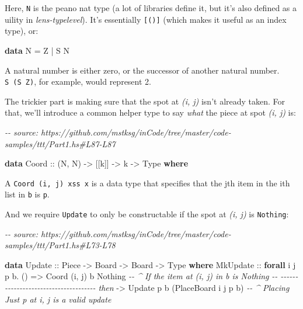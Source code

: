 \documentclass[]{article}
\newenvironment{Shaded}{}{}
\newcommand{\CommentTok}[1]{\textcolor[rgb]{0.38,0.63,0.69}{\textit{#1}}}
\newcommand{\DataTypeTok}[1]{\textcolor[rgb]{0.56,0.13,0.00}{#1}}
\newcommand{\KeywordTok}[1]{\textcolor[rgb]{0.00,0.44,0.13}{\textbf{#1}}}
\newcommand{\NormalTok}[1]{#1}
\newcommand{\OperatorTok}[1]{\textcolor[rgb]{0.40,0.40,0.40}{#1}}
\newcommand{\OtherTok}[1]{\textcolor[rgb]{0.00,0.44,0.13}{#1}}
\begin{document}
Here, \texttt{N} is the peano nat type (a lot of libraries define it, but it's
also defined as a uility in \emph{lens-typelevel}). It's essentially
\texttt{{[}(){]}} (which makes it useful as an index type), or:

\begin{Shaded}
\begin{Highlighting}[]
\KeywordTok{data} \DataTypeTok{N} \OtherTok{=} \DataTypeTok{Z} \OperatorTok{|} \DataTypeTok{S} \DataTypeTok{N}
\end{Highlighting}
\end{Shaded}

A natural number is either zero, or the successor of another natural number.
\texttt{S\ (S\ Z)}, for example, would represent 2.

The trickier part is making sure that the spot at \emph{(i, j)} isn't already
taken. For that, we'll introduce a common helper type to say \emph{what} the
piece at spot \emph{(i, j)} is:

\begin{Shaded}
\begin{Highlighting}[]
\CommentTok{{-}{-} source: https://github.com/mstksg/inCode/tree/master/code{-}samples/ttt/Part1.hs\#L87{-}L87}

\KeywordTok{data} \DataTypeTok{Coord}\OtherTok{ ::}\NormalTok{ (}\DataTypeTok{N}\NormalTok{, }\DataTypeTok{N}\NormalTok{) }\OtherTok{{-}>}\NormalTok{ [[k]] }\OtherTok{{-}>}\NormalTok{ k }\OtherTok{{-}>} \DataTypeTok{Type} \KeywordTok{where}
\end{Highlighting}
\end{Shaded}

A \texttt{Coord\ \textquotesingle{}(i,\ j)\ xss\ x} is a data type that
specifies that the jth item in the ith list in \texttt{b} is \texttt{p}.

And we require \texttt{Update} to only be constructable if the spot at \emph{(i,
j)} is \texttt{Nothing}:

\begin{Shaded}
\begin{Highlighting}[]
\CommentTok{{-}{-} source: https://github.com/mstksg/inCode/tree/master/code{-}samples/ttt/Part1.hs\#L73{-}L78}

\KeywordTok{data} \DataTypeTok{Update}\OtherTok{ ::} \DataTypeTok{Piece} \OtherTok{{-}>} \DataTypeTok{Board} \OtherTok{{-}>} \DataTypeTok{Board} \OtherTok{{-}>} \DataTypeTok{Type} \KeywordTok{where}
    \DataTypeTok{MkUpdate}
\OtherTok{        ::} \KeywordTok{forall}\NormalTok{ i j p b}\OperatorTok{.}\NormalTok{ ()}
        \OtherTok{=>} \DataTypeTok{Coord}\NormalTok{ \textquotesingle{}(i, j) b }\DataTypeTok{\textquotesingle{}Nothing}         \CommentTok{{-}{-} \^{} If the item at (i, j) in b is Nothing}
        \CommentTok{{-}{-} {-}{-}{-}{-}{-}{-}{-}{-}{-}{-}{-}{-}{-}{-}{-}{-}{-}{-}{-}{-}{-}{-}{-}{-}{-}{-}{-}{-}{-}{-}{-}{-}{-}{-}{-}{-}{-} then}
        \OtherTok{{-}>} \DataTypeTok{Update}\NormalTok{ p b (}\DataTypeTok{PlaceBoard}\NormalTok{ i j p b)  }\CommentTok{{-}{-} \^{} Placing \textasciigrave{}Just p\textasciigrave{} at i, j is a valid update}
\end{Highlighting}
\end{Shaded}
\end{document}
